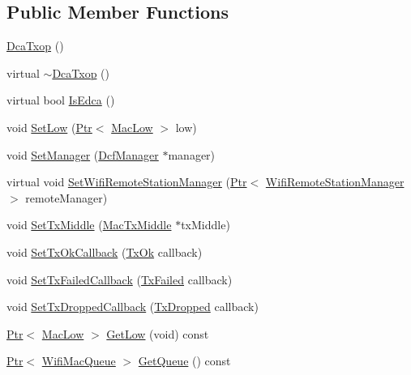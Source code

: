 \subsection*{Public Member Functions}
\begin{DoxyCompactItemize}
\item 
\hyperlink{classns3_1_1DcaTxop_a73861f6fb39333b1a260a3b020b01e3d}{Dca\+Txop} ()
\item 
virtual \hyperlink{classns3_1_1DcaTxop_a79a5857299d008ed6f714a90d5e35360}{$\sim$\+Dca\+Txop} ()
\item 
virtual bool \hyperlink{classns3_1_1DcaTxop_ae8633b9209116b70be9d8b2511239dc0}{Is\+Edca} ()
\item 
void \hyperlink{classns3_1_1DcaTxop_a297ac12852a5e6854e4068b2767f767d}{Set\+Low} (\hyperlink{classns3_1_1Ptr}{Ptr}$<$ \hyperlink{classns3_1_1MacLow}{Mac\+Low} $>$ low)
\item 
void \hyperlink{classns3_1_1DcaTxop_ae13ebd282b7d27b43722becc5789be65}{Set\+Manager} (\hyperlink{classns3_1_1DcfManager}{Dcf\+Manager} $\ast$manager)
\item 
virtual void \hyperlink{classns3_1_1DcaTxop_a697ca989666ad76b1886f2b20e39b7a4}{Set\+Wifi\+Remote\+Station\+Manager} (\hyperlink{classns3_1_1Ptr}{Ptr}$<$ \hyperlink{classns3_1_1WifiRemoteStationManager}{Wifi\+Remote\+Station\+Manager} $>$ remote\+Manager)
\item 
void \hyperlink{classns3_1_1DcaTxop_a45964693593c510b735b4ec190157b9a}{Set\+Tx\+Middle} (\hyperlink{classns3_1_1MacTxMiddle}{Mac\+Tx\+Middle} $\ast$tx\+Middle)
\item 
void \hyperlink{classns3_1_1DcaTxop_aa9350af97f7811283eccc1bdc60e2a37}{Set\+Tx\+Ok\+Callback} (\hyperlink{classns3_1_1DcaTxop_a773f1ef847db20e0618ab9e7378a3023}{Tx\+Ok} callback)
\item 
void \hyperlink{classns3_1_1DcaTxop_a139f754e833725a2b2a2d82740a13859}{Set\+Tx\+Failed\+Callback} (\hyperlink{classns3_1_1DcaTxop_a3ebd4f13afc638a908343e187f9d5514}{Tx\+Failed} callback)
\item 
void \hyperlink{classns3_1_1DcaTxop_a3988aadb1d4fe4cfe348904866b26b54}{Set\+Tx\+Dropped\+Callback} (\hyperlink{classns3_1_1DcaTxop_a38a5d5eb96a8679b8d88d775fddffd86}{Tx\+Dropped} callback)
\item 
\hyperlink{classns3_1_1Ptr}{Ptr}$<$ \hyperlink{classns3_1_1MacLow}{Mac\+Low} $>$ \hyperlink{classns3_1_1DcaTxop_ae69735f4f2861cd143192c1072cbae79}{Get\+Low} (void) const 
\item 
\hyperlink{classns3_1_1Ptr}{Ptr}$<$ \hyperlink{namespacens3_a3ca96bcdf02c0e7cacea08ca62ead54c}{Wifi\+Mac\+Queue} $>$ \hyperlink{classns3_1_1DcaTxop_a6c89d0aeccbc5e8724d404bc45f796d7}{Get\+Queue} () const 

\end{DoxyCompactItemize}
